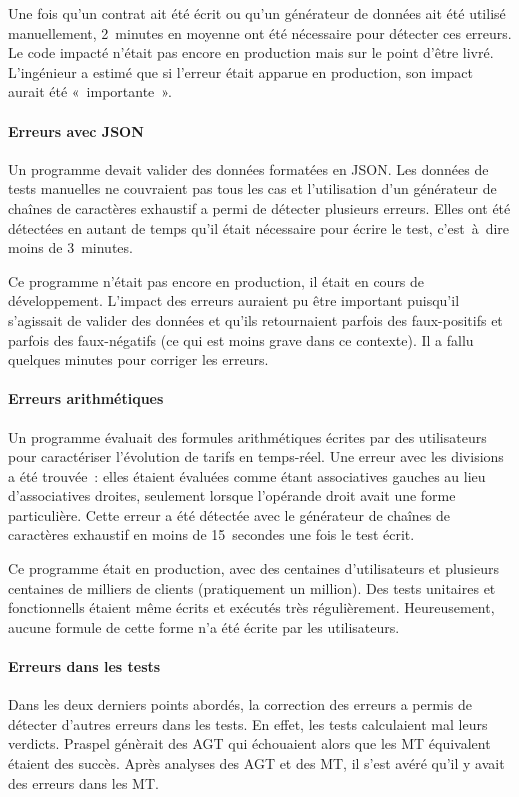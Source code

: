 Une fois qu'un contrat ait été écrit ou qu'un générateur de données ait été
utilisé manuellement, 2~minutes en moyenne ont été nécessaire pour détecter ces
erreurs. Le code impacté n'était pas encore en production mais sur le point
d'être livré. L'ingénieur a estimé que si l'erreur était apparue en production,
son impact aurait été «~importante~».

\paragraph{Erreurs avec JSON} Un programme devait valider des données formatées
en JSON. Les données de tests manuelles ne couvraient pas tous les cas et
l'utilisation d'un générateur de chaînes de caractères exhaustif a permi de
détecter plusieurs erreurs. Elles ont été détectées en autant de temps qu'il
était nécessaire pour écrire le test, c'est~à~dire moins de 3~minutes. 

Ce programme n'était pas encore en production, il était en cours de
développement. L'impact des erreurs auraient pu être important puisqu'il
s'agissait de valider des données et qu'ils retournaient parfois des
faux-positifs et parfois des faux-négatifs (ce qui est moins grave dans ce
contexte). Il a fallu quelques minutes pour corriger les erreurs.

\paragraph{Erreurs arithmétiques} Un programme évaluait des formules
arithmétiques écrites par des utilisateurs pour caractériser l'évolution de
tarifs en temps-réel. Une erreur avec les divisions a été trouvée~: elles
étaient évaluées comme étant associatives gauches au lieu d'associatives
droites, seulement lorsque l'opérande droit avait une forme particulière. Cette
erreur a été détectée avec le générateur de chaînes de caractères exhaustif en
moins de 15~secondes une fois le test écrit.

Ce programme était en production, avec des centaines d'utilisateurs et plusieurs
centaines de milliers de clients (pratiquement un million). Des tests unitaires
et fonctionnells étaient même écrits et exécutés très régulièrement.
Heureusement, aucune formule de cette forme n'a été écrite par les utilisateurs.

\paragraph{Erreurs dans les tests} Dans les deux derniers points abordés, la
correction des erreurs a permis de détecter d'autres erreurs dans les tests. En
effet, les tests calculaient mal leurs verdicts. Praspel génèrait des AGT qui
échouaient alors que les MT équivalent étaient des succès. Après analyses des
AGT et des MT, il s'est avéré qu'il y avait des erreurs dans les MT.

